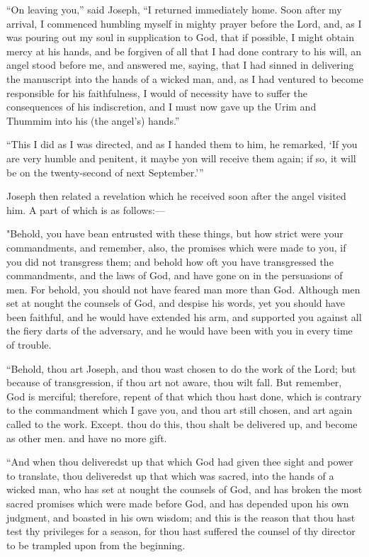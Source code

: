 		``On leaving you,'' said Joseph, ``I returned immediately home. Soon after my arrival, I commenced humbling myself in mighty prayer before the Lord, and, as I was pouring out my soul in supplication to God, that if possible, I might obtain mercy at his hands, and be forgiven of all that I had done contrary to his will, an angel stood before me, and answered me, saying, that I had sinned in delivering the manuscript into the hands of a wicked man, and, as I had ventured to become responsible for his faithfulness, I would of necessity have to suffer the consequences of his indiscretion, and I must now gave up the Urim and Thummim into his (the angel's) hands.''

		``This I did as I was directed, and as I handed them to him, he remarked, `If you are very humble and penitent, it maybe yon will receive them again; if so, it will be on the twenty-second of next September.'''

		Joseph then related a revelation which he received soon after the angel visited him. A part of which is as follows:---

		"Behold, you have bean entrusted with these things, but how strict were your commandments, and remember, also, the promises which were made to you, if you did not transgress them; and behold how oft you have transgressed the commandments, and the laws of God, and have gone on in the persuasions of men. For behold, you should not have feared man more than God. Although men set at nought the counsels of God, and despise his words, yet you should have been faithful, and he would have extended his arm, and supported you against all the fiery darts of the adversary, and he would have been with you in every time of trouble.

		``Behold, thou art Joseph, and thou wast chosen to do the work of the Lord; but because of transgression, if thou art not aware, thou wilt fall. But remember, God is merciful; therefore, repent of that which thou hast done, which is contrary to the commandment which I gave you, and thou art still chosen, and art again called to the work. Except. thou do this, thou shalt be delivered up, and become as other men. and have no more gift.

		``And when thou deliveredst up that which God had given thee sight and power to translate, thou deliveredst up that which was sacred, into the hands of a wicked man, who has set at nought the counsels of God, and has broken the most sacred promises which were made before God, and has depended upon his own judgment, and boasted in his own wisdom; and this is the reason that thou hast test thy privileges for a season, for thou hast suffered the counsel of thy director to be trampled upon from the beginning.

